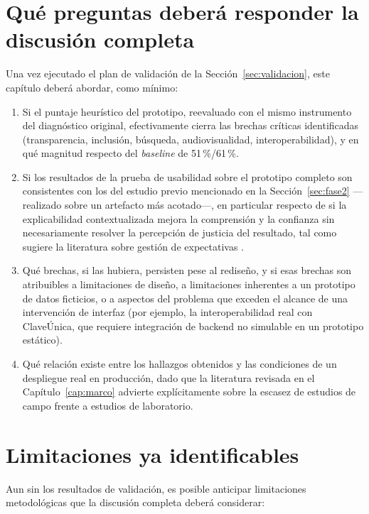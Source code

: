 \section{Qué preguntas deberá responder la discusión completa}

Una vez ejecutado el plan de validación de la Sección~\ref{sec:validacion}, este capítulo deberá abordar, como mínimo:

\begin{enumerate}
    \item Si el puntaje heurístico del prototipo, reevaluado con el mismo instrumento del diagnóstico original, efectivamente cierra las brechas críticas identificadas (transparencia, inclusión, búsqueda, audiovisualidad, interoperabilidad), y en qué magnitud respecto del \emph{baseline} de 51\,\%/61\,\%.
    \item Si los resultados de la prueba de usabilidad sobre el prototipo completo son consistentes con los del estudio previo mencionado en la Sección~\ref{sec:fase2} —realizado sobre un artefacto más acotado—, en particular respecto de si la explicabilidad contextualizada mejora la comprensión y la confianza sin necesariamente resolver la percepción de justicia del resultado, tal como sugiere la literatura sobre gestión de expectativas \citep{springerwhittaker2019,springerwhittaker2020}.
    \item Qué brechas, si las hubiera, persisten pese al rediseño, y si esas brechas son atribuibles a limitaciones de diseño, a limitaciones inherentes a un prototipo de datos ficticios, o a aspectos del problema que exceden el alcance de una intervención de interfaz (por ejemplo, la interoperabilidad real con ClaveÚnica, que requiere integración de backend no simulable en un prototipo estático).
    \item Qué relación existe entre los hallazgos obtenidos y las condiciones de un despliegue real en producción, dado que la literatura revisada en el Capítulo~\ref{cap:marco} advierte explícitamente sobre la escasez de estudios de campo frente a estudios de laboratorio.
\end{enumerate}

\section{Limitaciones ya identificables}\label{sec:limitaciones}

Aun sin los resultados de validación, es posible anticipar limitaciones metodológicas que la discusión completa deberá considerar:

